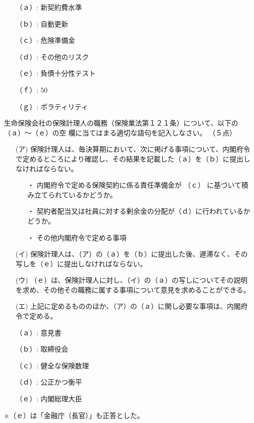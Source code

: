 \documentclass[report,gutter=10mm,fore-edge=10mm,uplatex,dvipdfmx]{jlreq}
\begin{document}
\answer{}
\begin{itemize}
\item[ （ａ）: ] 新契約費水準
\item[ （ｂ）: ] 自動更新
\item[ （ｃ）: ] 危険準備金
\item[ （ｄ）: ] その他のリスク
\item[ （ｅ）: ] 負債十分性テスト
\item[ （ｆ）: ] 50
\item[ （ｇ）: ] ボラティリティ
\end{itemize}

生命保険会社の保険計理人の職務（保険業法第１２１条）について、以下の（ａ）～（ｅ）の空
欄に当てはまる適切な語句を記入しなさい。
（５点）

\begin{itemize}
\item[(ア)] 保険計理人は、毎決算期において、次に掲げる事項について、内閣府令で定めるところにより確認し、その結果を記載した（ａ）を（ｂ）に提出しなければならない。
\begin{itemize}
\item[・]  内閣府令で定める保険契約に係る責任準備金が （ｃ） に基づいて積み立てられているかどうか。
\item[・]  契約者配当又は社員に対する剰余金の分配が（ｄ）に行われているかどうか。
\item[・]  その他内閣府令で定める事項
\end{itemize}
\item[(イ)] 保険計理人は、（ア）の（ａ）を（ｂ）に提出した後、遅滞なく、その写しを（ｅ）に提出しなければならない。
\item[(ウ)] （ｅ）は、保険計理人に対し、（イ）の（ａ）の写しについてその説明を求め、その他その職務に属する事項について意見を求めることができる。
\item[(エ)] 上記に定めるもののほか、（ア）の（ａ）に関し必要な事項は、内閣府令で定める。
\end{itemize}

\answer{}
\begin{itemize}
\item[ （ａ）: ] 意見書
\item[ （ｂ）: ] 取締役会
\item[ （ｃ）: ] 健全な保険数理
\item[ （ｄ）: ] 公正かつ衡平
\item[ （ｅ）: ] 内閣総理大臣
\end{itemize}
※（ｅ）は「金融庁（長官）」も正答とした。
\end{document}
